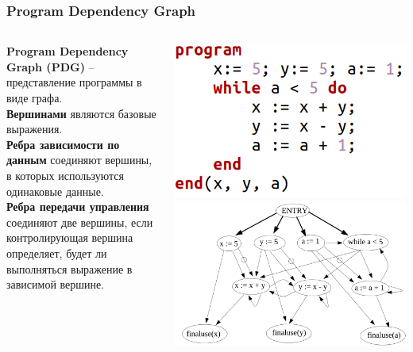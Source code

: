 \documentclass[10pt]{beamer}
\begin{document}
\begin{frame}\frametitle{Program Dependency Graph}
	\begin{columns}
		\begin{definition}
			\textbf{Program Dependency Graph (PDG)} -- представление программы в виде графа. \\
			\textbf{Вершинами} являются базовые выражения. \\
			\textbf{Ребра зависимости по данным} соединяют вершины, в которых используются одинаковые данные. \\
			\textbf{Ребра передачи управления} соединяют две вершины, если контролирующая вершина определяет, будет ли выполняться выражение в зависимой вершине.
		\end{definition}
		
		\flushleft \hspace*{0.6cm}\includegraphics[scale=0.65]{pdg_code.png}
		\includegraphics[scale=0.28]{pdg_example.png}
		\newline
		
	\end{columns}
\end{frame}
\end{document}
